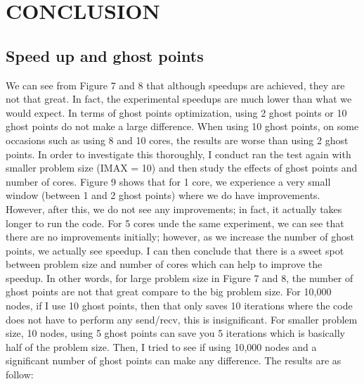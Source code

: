 \documentclass[12pt]{article}
\begin{document}
    \newpage
    \section{CONCLUSION}

    \subsection{Speed up and ghost points}
    We can see from Figure 7 and 8 that although speedups are achieved, they are not that great. In fact, the experimental speedups are much lower than what we would expect. In terms of ghost points optimization, using 2 ghost points or 10 ghost points do not make a large difference. When using 10 ghost points, on some occasions such as using 8 and 10 cores, the results are worse than using 2 ghost points.  In order to investigate this thoroughly, I conduct ran the test again with smaller problem size (IMAX = 10) and then study the effects of ghost points and number of cores.  Figure 9 shows that for 1 core, we experience a very small window (between 1 and 2 ghost points) where we do have improvements.  However, after this, we do not see any improvements; in fact, it actually takes longer to run the code.  For 5 cores unde the same experiment, we can see that there are no improvements initially; however, as we increase the number of ghost points, we actually see speedup. I can then conclude that there is a sweet spot between problem size and number of cores which can help to improve the speedup.  In other words, for large problem size in Figure 7 and 8, the number of ghost points are not that great compare to the big problem size.  For 10,000 nodes, if I use 10 ghost points, then that only saves 10 iterations where the code does not have to perform any send/recv, this is insignificant.  For smaller problem size, 10 nodes, using 5 ghost points can save you 5 iterations which is basically half of the problem size.  Then, I tried to see if using 10,000 nodes and a significant number of ghost points can make any difference.  The results are as follow: 
    
\end{document}
